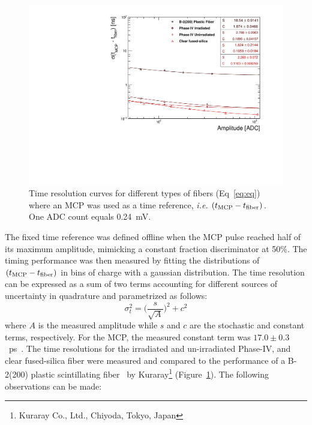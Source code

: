 \documentclass[a4paper,11pt]{article}
\begin{document}
\begin{figure}[ht]
\begin{center}
      \includegraphics[width=12cm]{Figures/fibres_time_res}
\caption{\small Time resolution curves for different types of fibers (Eq~\ref{eq:eq}) where an MCP was used as a time reference, {\it i.e.} $(t_{\rm MCP} - t_{\rm fiber})$.  One ADC count equals 0.24~mV.}
    \label{fig:fibres_time_res}
\end{center}
\end{figure}

The fixed time reference was defined offline when the MCP pulse reached half of its maximum amplitude, mimicking a constant fraction discriminator at 50\%. The timing performance was then measured by fitting the distributions of $(t_{\rm MCP} - t_{\rm fiber})$ in bins of charge with a gaussian distribution.  The time resolution can be expressed as a sum of two terms accounting for different sources of uncertainty in quadrature and parametrized as follows:
\begin{equation}
    \sigma_t^2 = \bigg( \frac{s}{\sqrt{A}} \bigg)^2 + c^2
    \label{eq:eq}
\end{equation}
where $A$ is the measured amplitude while $s$ and $c$ are the stochastic and constant terms, respectively. For the MCP, the measured constant term was $17.0\pm0.3$~ps~\cite{r-MCP}.  The time resolutions for the irradiated and un-irradiated Phase-IV, and clear fused-silica fiber were measured and compared to the performance of a B-2(200) plastic scintillating fiber~\cite{r-B2} by Kuraray\footnote{Kuraray Co., Ltd., Chiyoda, Tokyo, Japan} (Figure~\ref{fig:fibres_time_res}).  The following observations can be made:
\end{document}
